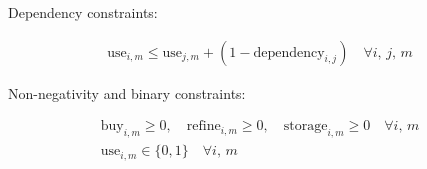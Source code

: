 \documentclass{article}
\begin{document}
\noindent Dependency constraints:

\begin{equation}
\begin{aligned}
    \text{use}_{i,m} \leq \text{use}_{j,m} + (1-\text{dependency}_{i,j}) \quad \forall i, \, j, \, m
\end{aligned}
\end{equation}

\noindent Non-negativity and binary constraints:

\begin{equation}
\begin{aligned}
    \text{buy}_{i,m} \geq 0, \quad \text{refine}_{i,m} \geq 0, \quad \text{storage}_{i,m} \geq 0 \quad \forall i, \, m \\
    \text{use}_{i,m} \in \{0, 1\} \quad \forall i, \, m
\end{aligned}
\end{equation}
\end{document}
